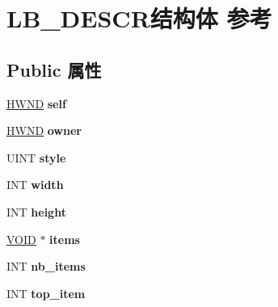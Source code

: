 \hypertarget{struct_l_b___d_e_s_c_r}{}\section{L\+B\+\_\+\+D\+E\+S\+C\+R结构体 参考}
\label{struct_l_b___d_e_s_c_r}
\subsection*{Public 属性}
\begin{DoxyCompactItemize}
\item 
\mbox{\label{struct_l_b___d_e_s_c_r_af7ce7c615f7933f601532e65f57913e1}} 
\hyperlink{interfacevoid}{H\+W\+ND} {\bfseries self}
\item 
\mbox{\label{struct_l_b___d_e_s_c_r_a395d555866e726aa794072fed59eb7b2}} 
\hyperlink{interfacevoid}{H\+W\+ND} {\bfseries owner}
\item 
\mbox{\label{struct_l_b___d_e_s_c_r_a7b2a2b9a678425c5f61ca334351ed321}} 
U\+I\+NT {\bfseries style}
\item 
\mbox{\label{struct_l_b___d_e_s_c_r_afcfbab006e59f9a9ab33ed81a7da17e4}} 
I\+NT {\bfseries width}
\item 
\mbox{\label{struct_l_b___d_e_s_c_r_a66d5313018774e2b8d8a3ed0b1ea3269}} 
I\+NT {\bfseries height}
\item 
\mbox{\label{struct_l_b___d_e_s_c_r_a82dd8a634c550efc08b9c274c4a189c6}} 
\hyperlink{interfacevoid}{V\+O\+ID} $\ast$ {\bfseries items}
\item 
\mbox{\label{struct_l_b___d_e_s_c_r_a6969a84c2f0800ee3816a84edc3c2dac}} 
I\+NT {\bfseries nb\+\_\+items}
\item 
\mbox{\label{struct_l_b___d_e_s_c_r_a03d498137b4239ebe6c71b7ed9275f36}} 
I\+NT {\bfseries top\+\_\+item}
\item 
\mbox{\label{struct_l_b___d_e_s_c_r_a9a1b2e7b2a02e1cb6076557115907747}} 

\end{DoxyCompactItemize}
